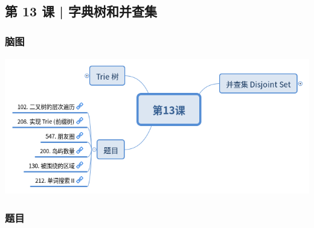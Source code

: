 \subsection{第 13 课 | 字典树和并查集}

\subsubsection{脑图}

\includegraphics[width=140mm,height=60mm]{images/camp/第13课.png}

\subsubsection{题目}
